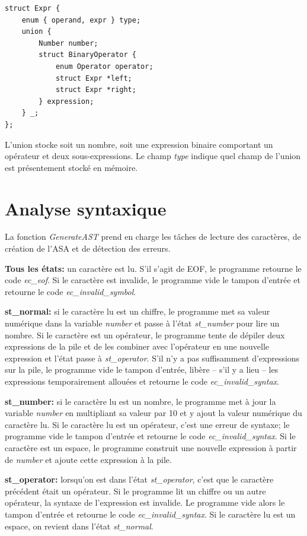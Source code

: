 \documentclass[10pt]{report}
\begin{document}
\begin{verbatim}
struct Expr {
    enum { operand, expr } type;
    union {
        Number number;
        struct BinaryOperator {
            enum Operator operator;
            struct Expr *left;
            struct Expr *right;
        } expression;
    } _;
};
\end{verbatim}

L'union stocke soit un nombre, soit une expression binaire comportant un
opérateur et deux sous-expressions.  Le champ \emph{type} indique quel champ
de l'union est présentement stocké en mémoire.


\newpage

\section{Analyse syntaxique}

La fonction \emph{GenerateAST} prend en charge les tâches de lecture des
caractères, de création de l'ASA et de détection des erreurs.

\textbf{Tous les états:} un caractère est lu.  S'il s'agit de EOF, le
programme retourne le code \emph{ec\_eof}.  Si le caractère est invalide, le
programme vide le tampon d'entrée et retourne le code
\emph{ec\_invalid\_symbol}.

\textbf{st\_normal:} si le caractère lu est un chiffre, le programme met sa
valeur numérique dans la variable \emph{number} et passe à l'état
\emph{st\_number} pour lire un nombre.  Si le caractère est un opérateur, le
programme tente de dépiler deux expressions de la pile et de les combiner avec
l'opérateur en une nouvelle expression et l'état passe à \emph{st\_operator}.
S'il n'y a pas suffisamment d'expressions sur la pile, le programme vide le
tampon d'entrée, libère -- s'il y a lieu -- les expressions temporairement
allouées et retourne le code \emph{ec\_invalid\_syntax}.

\textbf{st\_number:} si le caractère lu est un nombre, le programme met à jour
la variable \emph{number} en multipliant sa valeur par 10 et y ajout la valeur
numérique du caractère lu.  Si le caractère lu est un opérateur, c'est une
erreur de syntaxe; le programme vide le tampon d'entrée et retourne le code
\emph{ec\_invalid\_syntax}.  Si le caractère est un espace, le programme
construit une nouvelle expression à partir de \emph{number} et ajoute cette
expression à la pile.

\textbf{st\_operator:} lorsqu'on est dans l'état \emph{st\_operator}, c'est
que le caractère précédent était un opérateur.  Si le programme lit un chiffre
ou un autre opérateur, la syntaxe de l'expression est invalide.  Le programme
vide alors le tampon d'entrée et retourne le code \emph{ec\_invalid\_syntax}.
Si le caractère lu est un espace, on revient dans l'état \emph{st\_normal}.
\end{document}
